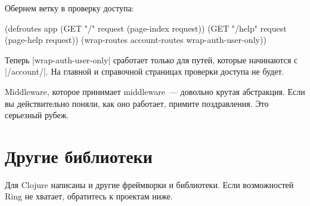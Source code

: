 \noindent
Обернем ветку в проверку доступа:

\begin{english}
  \begin{clojure}
(defroutes app
  (GET "/" request (page-index request))
  (GET "/help" request (page-help request))
  (wrap-routes account-routes wrap-auth-user-only))
  \end{clojure}
\end{english}

Теперь \spverb|wrap-auth-user-only| сработает только для путей, которые
начинаются с \spverb|/account/|. На главной и справочной страницах проверки
доступа не будет.

Middleware, которое принимает middleware~--- довольно крутая абстракция. Если вы
действительно поняли, как оно работает, примите поздравления. Это серьезный
рубеж.

\section{Другие библиотеки}

Для Clojure написаны и другие фреймворки и библиотеки. Если возможностей Ring не
хватает, обратитесь к проектам ниже.


